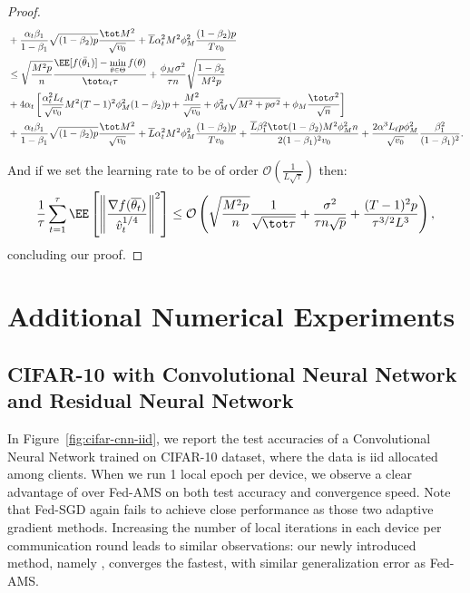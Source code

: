 \documentclass[11pt]{article}
\begin{document}
\begin{proof}
\begin{align*}
   &  +\frac{\alpha_t \beta_1}{1-\beta_1}  \sqrt{(1-\beta_2)p} \frac{\tot M^2}{\sqrt{v_0}} +\overline{L} \alpha_t^2 M^2 \phi_M^2 \frac{(1-\beta_2)p}{Tv_0} \nonumber\\
   & \leq   \sqrt{\frac{M^2 p}{n}}  \frac{ \EE[f(\bar{\theta}_1)]  - \min \limits_{\theta \in \Theta} f(\theta)}{\tot \alpha_t \tau} +      \frac{\phi_M   \sigma^2}{\tau n} \sqrt{\frac{1 - \beta_2}{M^2 p}  } \nonumber\\
    &   +4\alpha_t \left[ \frac{\alpha_t^2 L_\ell}{\sqrt{v_0}}  M^2 (T-1)^2 \phi_M^2 (1-\beta_2)p + \frac{M^2}{\sqrt{v_0}}+\phi_M^2\sqrt{M^2+p\sigma^2} + \phi_M \frac{\tot \sigma^2}{\sqrt{n}}\right]   \nonumber\\
   &  +\frac{\alpha_t \beta_1}{1-\beta_1}  \sqrt{(1-\beta_2)p} \frac{\tot M^2}{\sqrt{v_0}} +\overline{L} \alpha_t^2 M^2 \phi_M^2 \frac{(1-\beta_2)p}{Tv_0}  + \frac{ \overline{L}\beta_1^2\tot(1-\beta_2)M^2 \phi^2_M n}{2(1-\beta_1)^2 v_0}  +\frac{2\alpha^3 L_\ell p\phi_M^2}{ \sqrt{v_0}}\frac{\beta_1^2}{(1-\beta_1)^2}.
\end{align*}

And if we set the learning rate to be of order $\mathcal{O}(\frac{1}{L \sqrt{\tau}})$ then:
\begin{align*}
    \frac{1}{\tau}\sum_{t=1}^\tau  \EE\left[ \left\| \frac{\nabla f(\overline{\theta_t})}{\hat v_t^{1/4}}   \right \|^2 \right] \leq \mathcal{O}\left( \sqrt{\frac{M^2 p}{n}} \frac{1}{\sqrt{\tot \tau}} + \frac{\sigma^2 }{\tau n\sqrt{p}}+\frac{(T-1)^2p}{\tau^{3/2}L^3}\right),
\end{align*}
concluding our proof.

\end{proof}

\section{Additional Numerical Experiments}



\subsection{CIFAR-10 with Convolutional Neural Network and Residual Neural Network}

In Figure~\ref{fig:cifar-cnn-iid}, we report the test accuracies of a Convolutional Neural Network trained on CIFAR-10 dataset, where the data is iid allocated among clients. 
When we run 1 local epoch per device, we observe a clear advantage of \algo over Fed-AMS on both test accuracy and convergence speed.
Note that Fed-SGD again fails to achieve close performance as those two adaptive gradient methods. 
Increasing the number of local iterations in each device per communication round leads to similar observations: our newly introduced method, namely \algo, converges the fastest, with similar generalization error as Fed-AMS. 
\end{document}
